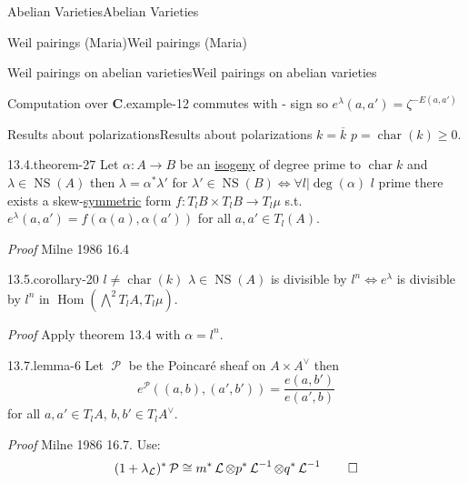 \documentclass[10pt,]{book}
\makeatletter
\renewcommand*{\proofname}{Proof}
\renewenvironment{proof}[1][\proofname]{\par
  \pushQED{\qed}%
  \normalfont \topsep6\p@\@plus6\p@\relax
  \trivlist
  \item\relax
    {\itshape
    #1\@addpunct{.}}\hspace\labelsep\ignorespaces
}{%
  \popQED\endtrivlist\@endpefalse
}
\numberwithin{equation}{section}
\newcommand{\sheaf}[1]{\operatorname{\mathcal{#1}}}
\newcommand{\CC}{\mathbf{C}}
\DeclareMathOperator{\Hom}{Hom}
\DeclareMathOperator{\characteristic}{char}
\DeclareMathOperator{\NS}{NS}
\makeatother
\begin{document}
\begin{chapterptx}{Abelian Varieties}{}{Abelian Varieties}{}{}
\begin{sectionptx}{Weil pairings (Maria)}{}{Weil pairings (Maria)}{}{}
\begin{subsectionptx}{Weil pairings on abelian varieties}{}{Weil pairings on abelian varieties}{}{}
\begin{example}{Computation over \(\CC\).}{example-12}
commutes with - sign so \(e^\lambda (a,a') = \zeta^{-E(a,a')}\)%
\end{example}
\end{subsectionptx}
%
%
\typeout{************************************************}
\typeout{************************************************}
%
\begin{subsectionptx}{Results about polarizations}{}{Results about polarizations}{}{}\label{subsection-30}
\hypertarget{p-309}{}%
\(k = \overline k\) \(p = \characteristic (k) \ge 0\).%
\begin{theorem}{13.4.}{}{theorem-27}%
\hypertarget{p-310}{}%
Let \(\alpha\colon A\to B\) be an \hyperref[def-supersing-isog-isog]{isogeny} of degree prime to \(\characteristic k\) and \(\lambda \in \NS(A)\) then \(\lambda = \alpha^* \lambda '\) for \(\lambda ' \in \NS(B) \iff \forall l |\deg(\alpha)\) \(l\) prime there exists a skew-\hyperref[def-princ-pol]{symmetric} form \(f\colon T_lB\times T_lB \to T_l\mu\) s.t. \(e^\lambda(a,a') = f(\alpha(a), \alpha(a'))\) for all \(a,a' \in T_l(A)\).%
\end{theorem}
\begin{proof}\hypertarget{proof-50}{}
\hypertarget{p-311}{}%
Milne 1986 16.4%
\end{proof}
\begin{corollary}{13.5.}{}{corollary-20}%
\hypertarget{p-312}{}%
\(l \ne \characteristic (k)\) \(\lambda \in \NS(A) \) is divisible by \(l^n \iff e^\lambda\) is divisible by \(l^n\) in \(\Hom (\bigwedge^2 T_lA, T_l \mu)\).%
\end{corollary}
\begin{proof}\hypertarget{proof-51}{}
\hypertarget{p-313}{}%
Apply theorem 13.4 with \(\alpha = l^n\).%
\end{proof}
\begin{lemma}{13.7.}{}{lemma-6}%
\hypertarget{p-314}{}%
Let \(\sheaf P\) be the Poincaré sheaf on \(A\times A^\vee\) then%
\begin{equation*}
e^{\sheaf P} ((a,b),(a',b')) = \frac{e(a,b')}{e(a',b)}
\end{equation*}
for all \(a,a' \in T_l A\), \(b,b' \in T_l A^\vee\).%
\end{lemma}
\begin{proof}\hypertarget{proof-52}{}
\hypertarget{p-315}{}%
Milne 1986 16.7. Use:%
\begin{equation*}
(1+ \lambda_{\sheaf L})^* \sheaf P \cong m^* \sheaf L \otimes p^* \sheaf L^{-1} \otimes q^* \sheaf L^{-1}\qedhere
\end{equation*}

\end{proof}
\end{subsectionptx}
\end{sectionptx}
\end{chapterptx}
\end{document}
